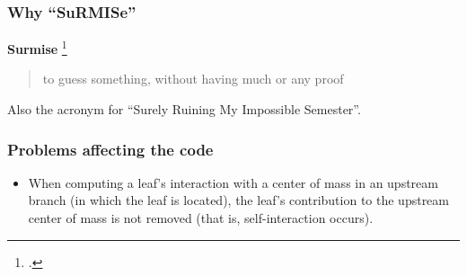 \appendix

\begin{frame}
	\frametitle{Why ``SuRMISe''}
	\textbf{Surmise} \footcite{surmise}
	\begin{quote}
		to guess something, without having much or any proof
	\end{quote}
	\par
	\vspace{1cm}
	Also the acronym for ``\alert{Su}rely \alert{R}uining \alert{M}y \alert{I}mpossible \alert{Se}mester''.
\end{frame}

\begin{frame}
	\frametitle{Problems affecting the code}
	\begin{itemize}
		\item When computing a leaf's interaction with a center of mass in an upstream branch (in which the leaf is located), the leaf's contribution to the upstream center of mass is not removed (that is, self-interaction occurs).
	\end{itemize}
\end{frame}